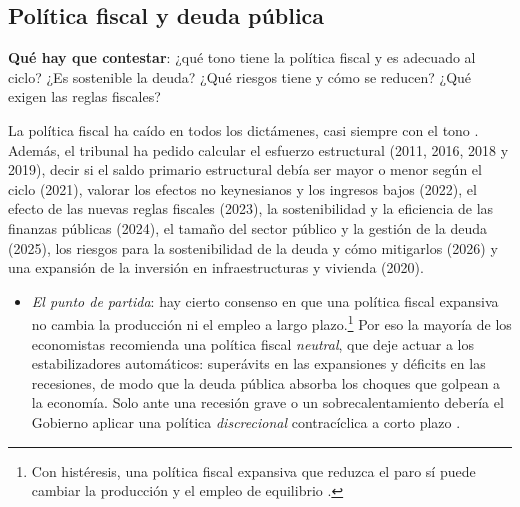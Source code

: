 \documentclass[11pt]{article}
\begin{document}
\subsection{Política fiscal y deuda pública}\label{sec:fiscal}

\begin{ideaclave}
\textbf{Qué hay que contestar}: ¿qué tono tiene la política fiscal y es adecuado al ciclo? ¿Es sostenible la deuda? ¿Qué riesgos tiene y cómo se reducen? ¿Qué exigen las reglas fiscales?
\end{ideaclave}

\begin{notaopositor}
La política fiscal ha caído en todos los dictámenes, casi siempre con el tono \parencite{ATCEE2026Examenes}. Además, el tribunal ha pedido calcular el esfuerzo estructural (2011, 2016, 2018 y 2019), decir si el saldo primario estructural debía ser mayor o menor según el ciclo (2021), valorar los efectos no keynesianos y los ingresos bajos (2022), el efecto de las nuevas reglas fiscales (2023), la sostenibilidad y la eficiencia de las finanzas públicas (2024), el tamaño del sector público y la gestión de la deuda (2025), los riesgos para la sostenibilidad de la deuda y cómo mitigarlos (2026) y una expansión de la inversión en infraestructuras y vivienda (2020).
\end{notaopositor}

\begin{itemize}
\item \emph{El punto de partida}: hay cierto consenso en que una política fiscal expansiva no cambia la producción ni el empleo a largo plazo.\footnote{Con histéresis, una política fiscal expansiva que reduzca el paro sí puede cambiar la producción y el empleo de equilibrio .} Por eso la mayoría de los economistas recomienda una política fiscal \emph{neutral}, que deje actuar a los estabilizadores automáticos: superávits en las expansiones y déficits en las recesiones, de modo que la deuda pública absorba los choques que golpean a la economía. Solo ante una recesión grave o un sobrecalentamiento debería el Gobierno aplicar una política \emph{discrecional} contracíclica a corto plazo .
\end{itemize}
\end{document}
